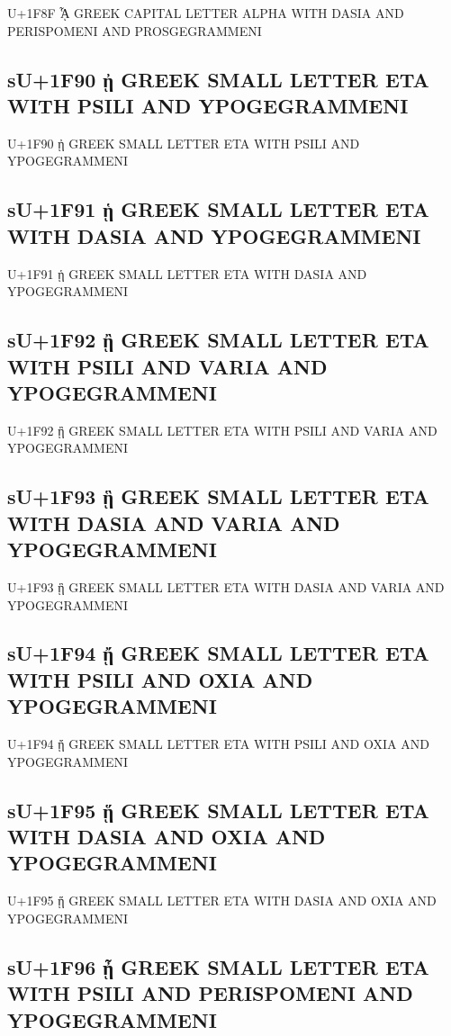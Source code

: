 U+1F8F ᾏ GREEK CAPITAL LETTER ALPHA WITH DASIA AND PERISPOMENI AND PROSGEGRAMMENI

\subsection{sU+1F90 ᾐ GREEK SMALL LETTER ETA WITH PSILI AND YPOGEGRAMMENI}

U+1F90 ᾐ GREEK SMALL LETTER ETA WITH PSILI AND YPOGEGRAMMENI

\subsection{sU+1F91 ᾑ GREEK SMALL LETTER ETA WITH DASIA AND YPOGEGRAMMENI}

U+1F91 ᾑ GREEK SMALL LETTER ETA WITH DASIA AND YPOGEGRAMMENI

\subsection{sU+1F92 ᾒ GREEK SMALL LETTER ETA WITH PSILI AND VARIA AND YPOGEGRAMMENI}

U+1F92 ᾒ GREEK SMALL LETTER ETA WITH PSILI AND VARIA AND YPOGEGRAMMENI

\subsection{sU+1F93 ᾓ GREEK SMALL LETTER ETA WITH DASIA AND VARIA AND YPOGEGRAMMENI}

U+1F93 ᾓ GREEK SMALL LETTER ETA WITH DASIA AND VARIA AND YPOGEGRAMMENI

\subsection{sU+1F94 ᾔ GREEK SMALL LETTER ETA WITH PSILI AND OXIA AND YPOGEGRAMMENI}

U+1F94 ᾔ GREEK SMALL LETTER ETA WITH PSILI AND OXIA AND YPOGEGRAMMENI

\subsection{sU+1F95 ᾕ GREEK SMALL LETTER ETA WITH DASIA AND OXIA AND YPOGEGRAMMENI}

U+1F95 ᾕ GREEK SMALL LETTER ETA WITH DASIA AND OXIA AND YPOGEGRAMMENI

\subsection{sU+1F96 ᾖ GREEK SMALL LETTER ETA WITH PSILI AND PERISPOMENI AND YPOGEGRAMMENI}

